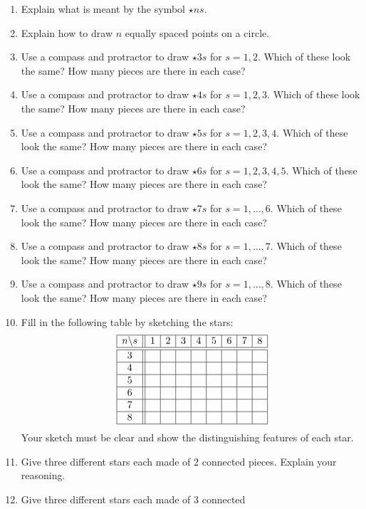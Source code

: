 \problems
\begin{enumerate}
\item Explain what is meant by the symbol $\star{n}{s}$.
\item Explain how to draw $n$ equally spaced points on a circle.
\item Use a compass and protractor to draw $\star{3}{s}$ for $s =
  1,2$. Which of these look the same?  How many pieces are there in
  each case?
\item Use a compass and protractor to draw $\star{4}{s}$ for $s =
  1,2,3$. Which of these look the same? How many pieces are there in
  each case?
\item Use a compass and protractor to draw $\star{5}{s}$ for $s =
  1,2,3,4$. Which of these look the same? How many pieces are there in
  each case?
\item Use a compass and protractor to draw $\star{6}{s}$ for $s =
  1,2,3,4,5$. Which of these look the same? How many pieces are there
  in each case?
\item Use a compass and protractor to draw $\star{7}{s}$ for $s =
  1,\dots,6$. Which of these look the same? How many pieces are there
  in each case?
\item Use a compass and protractor to draw $\star{8}{s}$ for $s =
  1,\dots,7$. Which of these look the same? How many pieces are there
  in each case?
\item Use a compass and protractor to draw $\star{9}{s}$ for $s =
  1,\dots,8$. Which of these look the same? How many pieces are there
  in each case?
\item Fill in the following table by sketching the stars: 
\[
\begin{array}{|c||c|c|c|c|c|c|c|c|}\hline
n\backslash s & 1 & 2 & 3 & 4 & 5 & 6 & 7 & 8 \\ \hline\hline
3 & & & & & & & & \\ \hline
4 & & & & & & & & \\ \hline
5 & & & & & & & & \\ \hline
6 & & & & & & & & \\ \hline
7 & & & & & & & & \\ \hline
8 & & & & & & & & \\ \hline
\end{array}
\]
Your sketch must
be clear and show the distinguishing features of each star.
\item Give three different stars each made of 2 connected
  pieces. Explain your reasoning.
\item Give three different stars each made of 3 connected

\end{enumerate}

